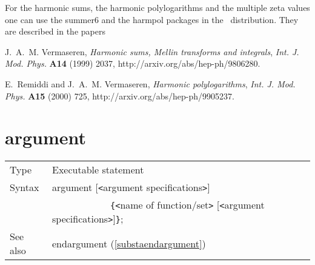 \noindent For the harmonic sums, the harmonic polylogarithms and the 
multiple zeta values one can use the summer6 and the harmpol packages in 
the \FORM\ distribution. They are described in the papers

J.~A.~M. Vermaseren, {\it Harmonic sums, Mellin transforms and integrals},
  {\em Int. J. Mod. Phys.} {\bf A14} (1999) 2037,
  http://arxiv.org/abs/hep-ph/9806280.

E.~Remiddi and J.~A.~M. Vermaseren, {\it Harmonic polylogarithms},  {\em 
Int. J. Mod. Phys.} {\bf A15} (2000) 725,
  http://arxiv.org/abs/hep-ph/9905237.
\vspace{10mm}


\section{argument}
\label{substaargument}

\noindent \begin{tabular}{ll}
Type & Executable statement\\
Syntax & argument [{\tt<}argument specifications{\tt>}] \\ &
    \ \ \ \ \ \ \ \ \ \ \ \
 \verb:{:{\tt<}name of function/set{\tt>}
[{\tt<}argument specifications{\tt>}]\verb:}:; \\
See also & endargument (\ref{substaendargument})
\end{tabular} \vspace{4mm}

